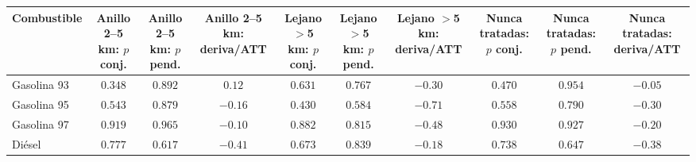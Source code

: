 \begin{tabular}{lccccccccc}
\toprule
Combustible & Anillo 2--5 km: $p$ conj. & Anillo 2--5 km: $p$ pend. & Anillo 2--5 km: deriva/ATT & Lejano $>$5 km: $p$ conj. & Lejano $>$5 km: $p$ pend. & Lejano $>$5 km: deriva/ATT & Nunca tratadas: $p$ conj. & Nunca tratadas: $p$ pend. & Nunca tratadas: deriva/ATT \\
\midrule
Gasolina 93 & $0.348$ & $0.892$ & $0.12$ & $0.631$ & $0.767$ & $-0.30$ & $0.470$ & $0.954$ & $-0.05$ \\
Gasolina 95 & $0.543$ & $0.879$ & $-0.16$ & $0.430$ & $0.584$ & $-0.71$ & $0.558$ & $0.790$ & $-0.30$ \\
Gasolina 97 & $0.919$ & $0.965$ & $-0.10$ & $0.882$ & $0.815$ & $-0.48$ & $0.930$ & $0.927$ & $-0.20$ \\
Diésel & $0.777$ & $0.617$ & $-0.41$ & $0.673$ & $0.839$ & $-0.18$ & $0.738$ & $0.647$ & $-0.38$ \\
\bottomrule
\end{tabular}
